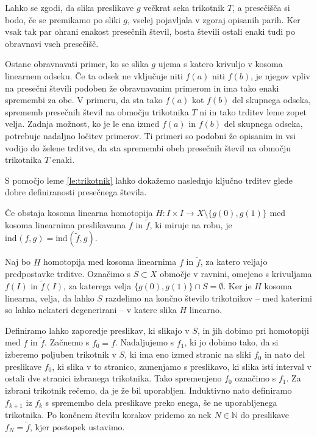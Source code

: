 \documentclass[mat1]{fmfdelo}
\newcommand{\N}{\mathbb N}
\newcommand{\ind}[3][]{\text{ind}_{#1}(#2, #3)}
\begin{document}
Lahko se zgodi, da slika preslikave $g$ večkrat seka trikotnik $T$, a presečišča si bodo, če se premikamo po sliki $g$, vselej pojavljala v zgoraj opisanih parih. Ker vsak tak par ohrani enakost presečnih števil, bosta števili ostali enaki tudi po obravnavi vseh presečišč.

Ostane obravnavati primer, ko se slika $g$ ujema s katero krivuljo v kosoma linearnem odseku. Če ta odsek ne vključuje niti $f(a)$ niti $f(b)$, je njegov vpliv na presečni števili podoben že obravnavanim primerom in ima tako enaki spremembi za obe. V primeru, da sta tako $f(a)$ kot $f(b)$ del skupnega odseka, sprememb presečnih števil na območju trikotnika $T$ ni in tako trditev leme zopet velja. Zadnja možnost, ko je le ena izmed $f(a)$ in $f(b)$ del skupnega odseka, potrebuje nadaljno ločitev primerov. Ti primeri so podobni že opisanim in vsi vodijo do želene trditve, da sta spremembi obeh presečnih števil na območju trikotnika $T$ enaki.
\endproof

S pomočjo leme \ref{le:trikotnik} lahko dokažemo naslednjo ključno trditev glede dobre definiranosti presečnega števila.
\begin{trditev}
Če obstaja kosoma linearna homotopija $H\colon I \times I \to X \setminus \{g(0), g(1)\}$ med kosoma linearnima preslikavama $f$ in $\widetilde{f}$, ki miruje na robu, je $\ind{f}{g} = \ind{\widetilde{f}}{g}$.
\end{trditev}
\proof
Naj bo $H$ homotopija med kosoma linearnima $f$ in $\widetilde{f}$, za katero veljajo predpostavke trditve. Označimo s $S\subset X$ območje v ravnini, omejeno s krivuljama $f(I)$ in $\widetilde{f}(I)$, za katerega velja $\{g(0), g(1)\} \cap S = \emptyset$. Ker je $H$ kosoma linearna, velja, da lahko $S$ razdelimo na končno število trikotnikov -- med katerimi so lahko nekateri degenerirani -- v katere slika $H$ linearno. 

Definiramo lahko zaporedje preslikav, ki slikajo v $S$, in jih dobimo pri homotopiji med $f$ in $\widetilde{f}$. Začnemo s $f_0 = f$. Nadaljujemo s $f_1$, ki jo dobimo tako, da si izberemo poljuben trikotnik v $S$, ki ima eno izmed stranic na sliki $f_0$ in nato del preslikave $f_0$, ki slika v to stranico, zamenjamo s preslikavo, ki slika isti interval v ostali dve stranici izbranega trikotnika. Tako spremenjeno $f_0$ označimo s $f_1$. Za izbrani trikotnik rečemo, da je že bil uporabljen. Induktivno nato definiramo $f_{k+1}$ iz $f_k$ s spremembo dela preslikave preko enega, še ne uporabljenega trikotnika. Po končnem številu korakov pridemo za nek $N \in \N$ do preslikave $f_N = \widetilde{f}$, kjer postopek ustavimo.
\end{document}
